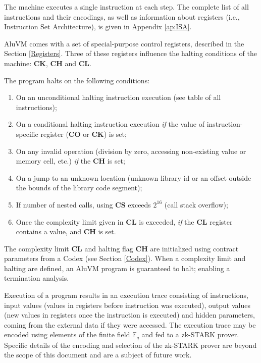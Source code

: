 \documentclass[9pt,oneside]{amsart}
\begin{document}
\begin{multicols}{2}
The machine executes a single instruction at each step.
The complete list of all instructions and their encodings,
as well as information about registers (i.e., Instruction Set Architecture),
is given in Appendix \ref{ap:ISA}.

AluVM comes with a set of special-purpose control registers,
described in the Section \ref{Registers}.
Three of these registers influence the halting conditions of the machine:
\textbf{CK}, \textbf{CH} and \textbf{CL}.

The program halts on the following conditions:

\begin{enumerate}
\item On an unconditional halting instruction execution (see table of all instructions);
\item On a conditional halting instruction execution
   \emph{if} the value of instruction-specific register (\textbf{CO} or \textbf{CK}) is set;
\item On any invalid operation (division by zero, accessing non-existing value or memory cell, etc.)
   \emph{if} the \textbf{CH} is set;
\item On a jump to an unknown location
   (unknown library id or an offset outside the bounds of the library code segment);
\item If number of nested calls, using \textbf{CS} exceeds $2^16$
   (call stack overflow);
\item Once the complexity limit given in \textbf{CL} is exceeded,
   \emph{if} the \textbf{CL} register contains a value, and \textbf{CH} is set.
\end{enumerate}

The complexity limit \textbf{CL} and halting flag \textbf{CH}
are initialized using contract parameters from a Codex (see Section \ref{Codex}).
When a complexity limit and halting are defined, an AluVM program is guaranteed to halt;
enabling a termination analysis.

Execution of a program results in an execution trace consisting of instructions,
input values (values in registers before instruction was executed),
output values (new values in registers once the instruction is executed)
and hidden parameters, coming from the external data if they were accessed.
The execution trace may be encoded using elements of the finite field $\mathbb{F}_q$
and fed to a zk-STARK prover.
Specific details of the encoding and selection of the zk-STARK prover
are beyond the scope of this document and are a subject of future work.


\end{multicols}
\end{document}
